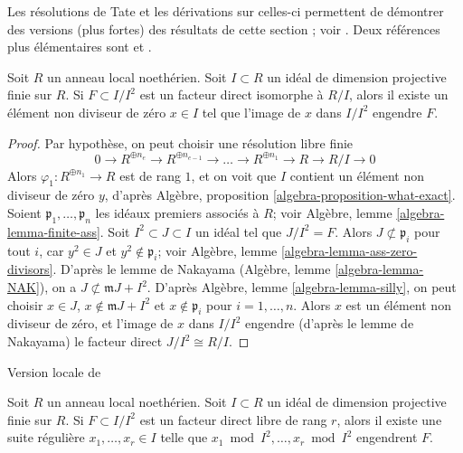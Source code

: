 \noindent
Les résolutions de Tate et les dérivations sur celles-ci permettent de
démontrer des versions (plus fortes) des résultats de cette section ; voir \cite{Iyengar}.
Deux références plus élémentaires sont
\cite{Vasconcelos} et \cite{Ferrand-lci}.

\begin{lemma}
\label{lemma-free-summand-in-ideal-finite-proj-dim}
\begin{reference}
\cite{Vasconcelos}
\end{reference}
Soit $R$ un anneau local noethérien. Soit $I \subset R$ un idéal
de dimension projective finie sur $R$. Si $F \subset I/I^2$ est
un facteur direct isomorphe à $R/I$, alors il existe un élément non diviseur de zéro
$x \in I$ tel que l'image de $x$ dans $I/I^2$ engendre $F$.
\end{lemma}

\begin{proof}
Par hypothèse, on peut choisir une résolution libre finie
$$
0 \to R^{\oplus n_e} \to R^{\oplus n_{e-1}} \to\ldots\to
R^{\oplus n_1} \to R \to R/I \to 0
$$
Alors $\varphi_1 : R^{\oplus n_1} \to R$ est de rang $1$,
et on voit que $I$ contient un élément non diviseur de zéro $y$,
d'après Algèbre, proposition \ref{algebra-proposition-what-exact}.
Soient $\mathfrak p_1, \ldots, \mathfrak p_n$ les idéaux premiers
associés à $R$; voir Algèbre, lemme \ref{algebra-lemma-finite-ass}.
Soit $I^2 \subset J \subset I$ un idéal tel que $J/I^2 = F$.
Alors $J \not\subset\mathfrak p_i$ pour tout $i$,
car $y^2 \in J$ et $y^2 \not\in\mathfrak p_i$;
voir Algèbre, lemme \ref{algebra-lemma-ass-zero-divisors}.
D'après le lemme de Nakayama (Algèbre, lemme \ref{algebra-lemma-NAK}),
on a $J \not\subset\mathfrak m J + I^2$.
D'après Algèbre, lemme \ref{algebra-lemma-silly},
on peut choisir $x \in J$, $x \not\in\mathfrak m J + I^2$ et
$x \not\in\mathfrak p_i$ pour $i = 1, \ldots, n$.
Alors $x$ est un élément non diviseur de zéro, et l'image
de $x$ dans $I/I^2$ engendre (d'après le lemme de Nakayama) le
facteur direct $J/I^2 \cong R/I$.
\end{proof}

\begin{lemma}
\label{lemma-vasconcelos}
\begin{reference}
Version locale de \cite[Theorem 1.1]{Vasconcelos}
\end{reference}
Soit $R$ un anneau local noethérien. Soit $I \subset R$ un idéal
de dimension projective finie sur $R$. Si $F \subset I/I^2$
est un facteur direct libre de rang $r$, alors il existe une suite régulière
$x_1, \ldots, x_r \in I$ telle que $x_1 \bmod I^2, \ldots, x_r \bmod I^2$
engendrent $F$.
\end{lemma}

